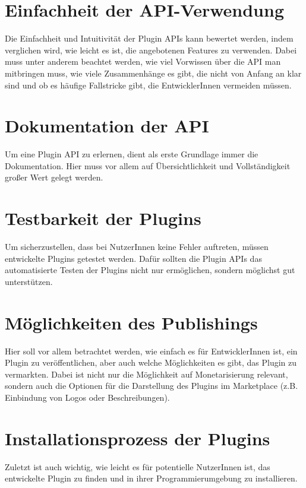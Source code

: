 \section{Einfachheit der API-Verwendung} 
\label{sec:Kriterien_Intuitivität}    
Die Einfachheit und Intuitivität der Plugin APIs kann bewertet werden,
indem verglichen wird, wie leicht es ist, die
angebotenen Features zu verwenden.
Dabei muss unter anderem beachtet werden, wie viel Vorwissen über die
API man mitbringen muss, wie viele Zusammenhänge es
gibt, die nicht von Anfang an klar sind und ob es 
häufige Fallstricke gibt, die EntwicklerInnen vermeiden müssen.

\section{Dokumentation der API} 
\label{sec:Kriterien_Dokumentation}    
Um eine Plugin API zu erlernen, dient als erste Grundlage
immer die Dokumentation. Hier muss vor allem
auf Übersichtlichkeit und Vollständigkeit großer Wert
gelegt werden.

\section{Testbarkeit der Plugins} 
\label{sec:Kriterien_Testbarkeit}
Um sicherzustellen, dass bei NutzerInnen keine Fehler auftreten,
müssen entwickelte Plugins getestet werden.
Dafür sollten die Plugin APIs das automatisierte
Testen der Plugins nicht nur ermöglichen, sondern möglichst
gut unterstützen.

\section{Möglichkeiten des Publishings} 
\label{sec:Kriterien_Publishing}    
Hier soll vor allem betrachtet werden, wie
einfach es für EntwicklerInnen ist, ein Plugin zu 
veröffentlichen, aber auch welche Möglichkeiten es gibt, 
das Plugin zu vermarkten. Dabei ist nicht nur die Möglichkeit
auf Monetarisierung relevant, sondern auch die
Optionen für die Darstellung des Plugins im Marketplace 
(z.B. Einbindung von Logos oder Beschreibungen).

\section{Installationsprozess der Plugins} 
\label{sec:Kriterien_Installationsprozess}    
Zuletzt ist auch wichtig, wie leicht es für potentielle 
NutzerInnen ist, das entwickelte Plugin zu finden und
in ihrer Programmierumgebung zu installieren.


